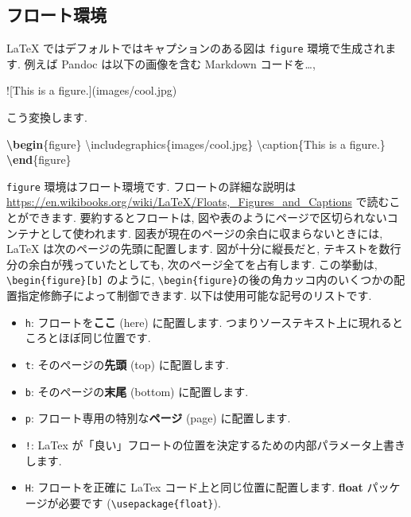 \documentclass[
  11pt,
  lualatex,
  ja=standard]{bxjsreport}
\newenvironment{Shaded}{\begin{snugshade}}{\end{snugshade}}
\newcommand{\AlertTok}[1]{\textcolor[rgb]{0.94,0.16,0.16}{#1}}
\newcommand{\BuiltInTok}[1]{#1}
\newcommand{\ExtensionTok}[1]{#1}
\newcommand{\FunctionTok}[1]{\textcolor[rgb]{0.00,0.00,0.00}{#1}}
\newcommand{\KeywordTok}[1]{\textcolor[rgb]{0.13,0.29,0.53}{\textbf{#1}}}
\newcommand{\NormalTok}[1]{#1}
\providecommand{\tightlist}{%
  \setlength{\itemsep}{0pt}\setlength{\parskip}{0pt}}
\begin{document}
\hypertarget{floating-environment}{%
\subsection{フロート環境}\label{floating-environment}}

LaTeX ではデフォルトではキャプションのある図は \texttt{figure} 環境で生成されます. 例えば Pandoc は以下の画像を含む Markdown コードを\ldots,

\begin{Shaded}
\begin{Highlighting}[]
\AlertTok{![This is a figure.](images/cool.jpg)}
\end{Highlighting}
\end{Shaded}

こう変換します.

\begin{Shaded}
\begin{Highlighting}[]
\KeywordTok{\textbackslash{}begin}\NormalTok{\{}\ExtensionTok{figure}\NormalTok{\}}
  \BuiltInTok{\textbackslash{}includegraphics}\NormalTok{\{}\ExtensionTok{images/cool.jpg}\NormalTok{\}}
  \FunctionTok{\textbackslash{}caption}\NormalTok{\{This is a figure.\}}
\KeywordTok{\textbackslash{}end}\NormalTok{\{}\ExtensionTok{figure}\NormalTok{\}}
\end{Highlighting}
\end{Shaded}

\texttt{figure} 環境はフロート環境です. フロートの詳細な説明は \url{https://en.wikibooks.org/wiki/LaTeX/Floats,_Figures_and_Captions} で読むことができます. 要約するとフロートは, 図や表のようにページで区切られないコンテナとして使われます. 図表が現在のページの余白に収まらないときには, LaTeX は次のページの先頭に配置します. 図が十分に縦長だと, テキストを数行分の余白が残っていたとしても, 次のページ全てを占有します. この挙動は, \texttt{\textbackslash{}begin\{figure\}{[}b{]}} のように, \texttt{\textbackslash{}begin\{figure\}}の後の角カッコ内のいくつかの配置指定修飾子によって制御できます. 以下は使用可能な記号のリストです.

\begin{itemize}
\tightlist
\item
  \texttt{h}: フロートを\textbf{ここ} (here) に配置します. つまりソーステキスト上に現れるところとほぼ同じ位置です.
\item
  \texttt{t}: そのページの\textbf{先頭} (top) に配置します.
\item
  \texttt{b}: そのページの\textbf{末尾} (bottom) に配置します.
\item
  \texttt{p}: フロート専用の特別な\textbf{ページ} (page) に配置します.
\item
  \texttt{!}: LaTex が「良い」フロートの位置を決定するための内部パラメータ上書きします.
\item
  \texttt{H}: フロートを正確に LaTex コード上と同じ位置に配置します. \textbf{float} パッケージが必要です (\texttt{\textbackslash{}usepackage\{float\}}).
\end{itemize}
\end{document}

